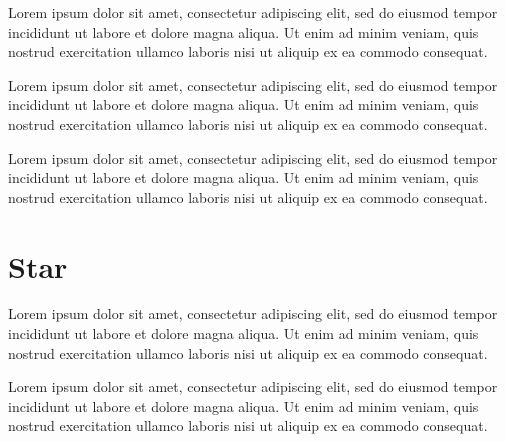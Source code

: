 \documentclass{report}
\begin{document}
Lorem ipsum dolor sit amet, consectetur adipiscing elit, sed do eiusmod tempor incididunt ut labore et dolore magna aliqua. Ut enim ad minim veniam, quis nostrud exercitation ullamco laboris nisi ut aliquip ex ea commodo consequat.

Lorem ipsum dolor sit amet, consectetur adipiscing elit, sed do eiusmod tempor incididunt ut labore et dolore magna aliqua. Ut enim ad minim veniam, quis nostrud exercitation ullamco laboris nisi ut aliquip ex ea commodo consequat.

Lorem ipsum dolor sit amet, consectetur adipiscing elit, sed do eiusmod tempor incididunt ut labore et dolore magna aliqua. Ut enim ad minim veniam, quis nostrud exercitation ullamco laboris nisi ut aliquip ex ea commodo consequat.

\section*{Star}
Lorem ipsum dolor sit amet, consectetur adipiscing elit, sed do eiusmod tempor incididunt ut labore et dolore magna aliqua. Ut enim ad minim veniam, quis nostrud exercitation ullamco laboris nisi ut aliquip ex ea commodo consequat.

Lorem ipsum dolor sit amet, consectetur adipiscing elit, sed do eiusmod tempor incididunt ut labore et dolore magna aliqua. Ut enim ad minim veniam, quis nostrud exercitation ullamco laboris nisi ut aliquip ex ea commodo consequat.
\end{document}
